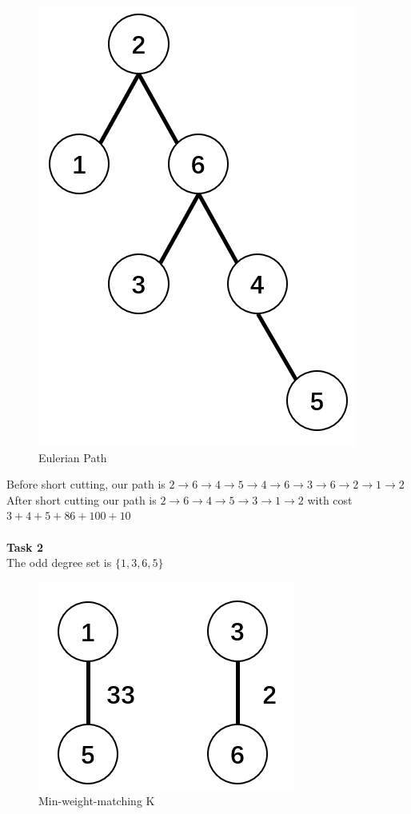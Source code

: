 \documentclass[a4paper]{article}
\begin{document}
    \begin{figure}[H]
        \centering
        \includegraphics[scale=0.25]{P3.png}
        \caption{Eulerian Path}
    \end{figure}
    Before short cutting, our path is $2\rightarrow6\rightarrow4\rightarrow5\rightarrow4\rightarrow6\rightarrow3\rightarrow6\rightarrow2\rightarrow1\rightarrow2$
    \\After short cutting our path is $2\rightarrow6\rightarrow4\rightarrow5\rightarrow3\rightarrow1\rightarrow2$ with cost $3+4+5+86+100+10$
\\\\ \textbf{Task 2}
\\The odd degree set is $\{1,3,6,5\}$
\begin{figure}[H]
    \centering
    \includegraphics[scale=0.25]{P4.png}
    \caption{Min-weight-matching K}
\end{figure}
\end{document}

